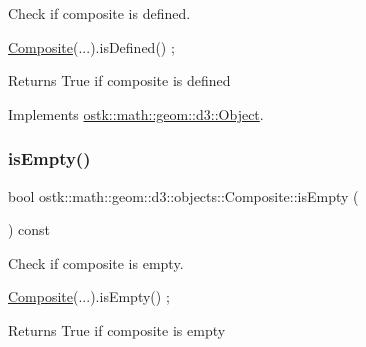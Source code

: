 Check if composite is defined. 


\begin{DoxyCode}
\hyperlink{classostk_1_1math_1_1geom_1_1d3_1_1objects_1_1_composite_aaecda2f184484d63a52de87706a37d4c}{Composite}(...).isDefined() ;
\end{DoxyCode}


\begin{DoxyReturn}{Returns}
True if composite is defined 
\end{DoxyReturn}


Implements \hyperlink{classostk_1_1math_1_1geom_1_1d3_1_1_object_a271a1964cd208be85ce9a0a429395ad8}{ostk\+::math\+::geom\+::d3\+::\+Object}.

\mbox{\label{classostk_1_1math_1_1geom_1_1d3_1_1objects_1_1_composite_ac7b84d04a89c0cd2ef9c3538792ac168}} 
\subsubsection{\texorpdfstring{is\+Empty()}{isEmpty()}}
{\footnotesize\ttfamily bool ostk\+::math\+::geom\+::d3\+::objects\+::\+Composite\+::is\+Empty (\begin{DoxyParamCaption}{ }\end{DoxyParamCaption}) const}



Check if composite is empty. 


\begin{DoxyCode}
\hyperlink{classostk_1_1math_1_1geom_1_1d3_1_1objects_1_1_composite_aaecda2f184484d63a52de87706a37d4c}{Composite}(...).isEmpty() ;
\end{DoxyCode}


\begin{DoxyReturn}{Returns}
True if composite is empty 
\end{DoxyReturn}
\mbox{\label{classostk_1_1math_1_1geom_1_1d3_1_1objects_1_1_composite_aa215a94dadd9a8912760c5c5ec4eb6e1}} 
